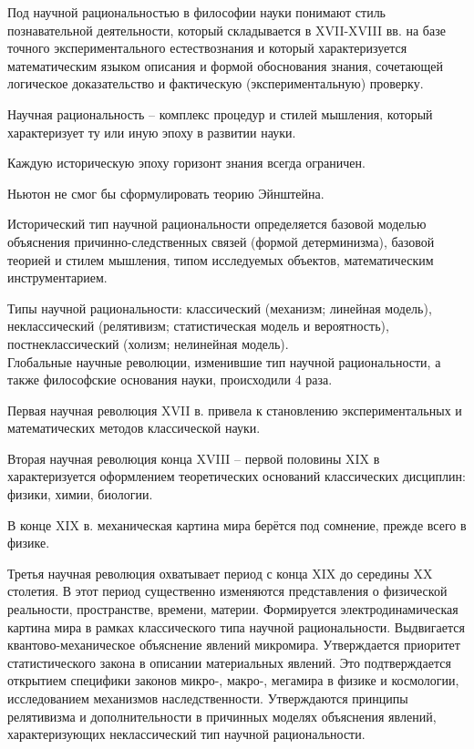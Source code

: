 \documentclass[exam_answers.tex]{subfiles}
\begin{document}
\renewcommand{\baselinestretch}{\blch}

Под научной рациональностью в философии науки понимают стиль познавательной деятельности, который складывается в XVII-XVIII вв. на базе точного экспериментального естествознания и который характеризуется математическим языком описания и формой обоснования знания, сочетающей логическое доказательство и фактическую (экспериментальную) проверку.

Научная рациональность – комплекс процедур и стилей мышления, который характеризует ту или иную эпоху в развитии науки.

Каждую историческую эпоху горизонт знания всегда ограничен.

Ньютон не смог бы сформулировать теорию Эйнштейна.

Исторический тип научной рациональности определяется базовой моделью объяснения причинно-следственных связей (формой детерминизма), базовой теорией и стилем мышления, типом исследуемых объектов, математическим инструментарием.

Типы научной рациональности: классический (механизм; линейная модель), неклассический (релятивизм; статистическая модель и вероятность), постнеклассический (холизм; нелинейная модель).
\\

Глобальные научные революции, изменившие тип научной рациональности, а также философские основания науки, происходили 4 раза.

Первая научная революция XVII в. привела к становлению экспериментальных и математических методов классической науки.

Вторая научная революция конца XVIII – первой половины XIX в характеризуется оформлением теоретических оснований классических дисциплин: физики, химии, биологии.

В конце XIX в. механическая картина мира берётся под сомнение, прежде всего в физике.

Третья научная революция охватывает период с конца XIX до середины XX столетия. В этот период существенно изменяются представления о физической реальности, пространстве, времени, материи.
Формируется электродинамическая картина мира в рамках классического типа научной рациональности.
Выдвигается квантово-механическое объяснение явлений микромира.
Утверждается приоритет статистического закона в описании материальных явлений.
Это подтверждается открытием специфики законов микро-, макро-, мегамира в физике и космологии, исследованием механизмов наследственности.
Утверждаются принципы релятивизма и дополнительности в причинных моделях объяснения явлений, характеризующих неклассический тип научной рациональности.
\end{document}
